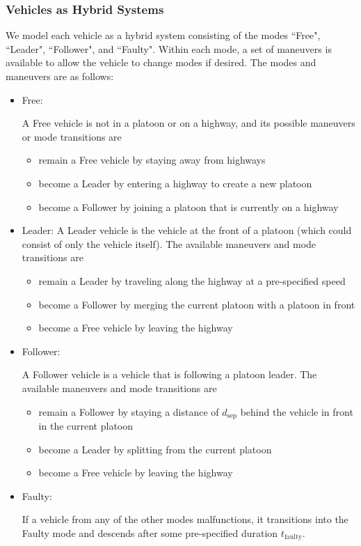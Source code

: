 \subsubsection{Vehicles as Hybrid Systems}
We model each vehicle as a hybrid system \cite{Lygeros98,Lygeros12} consisting of the modes ``Free", ``Leader", ``Follower", and ``Faulty". Within each mode, a set of maneuvers is available to allow the vehicle to change modes if desired. The modes and maneuvers are as follows:

\begin{itemize}
\item Free: 

A Free vehicle is not in a platoon or on a highway, and its possible maneuvers or mode transitions are
\begin{itemize}
\item remain a Free vehicle by staying away from highways
\item become a Leader by entering a highway to create a new platoon
\item become a Follower by joining a platoon that is currently on a highway
\end{itemize} 

\item Leader: 
A Leader vehicle is the vehicle at the front of a platoon (which could consist of only the vehicle itself). The available maneuvers and mode transitions are

\begin{itemize}
\item remain a Leader by traveling along the highway at a pre-specified speed
\item become a Follower by merging the current platoon with a platoon in front
\item become a Free vehicle by leaving the highway
\end{itemize}

\item Follower: 

A Follower vehicle is a vehicle that is following a platoon leader. The available maneuvers and mode transitions are 

\begin{itemize}
\item remain a Follower by staying a distance of $d_\text{sep}$ behind the vehicle in front in the current platoon
\item become a Leader by splitting from the current platoon
\item become a Free vehicle by leaving the highway
\end{itemize}

\item Faulty: 

If a vehicle from any of the other modes malfunctions, it transitions into the Faulty mode and descends after some pre-specified duration $t_\text{faulty}$.
\end{itemize}

